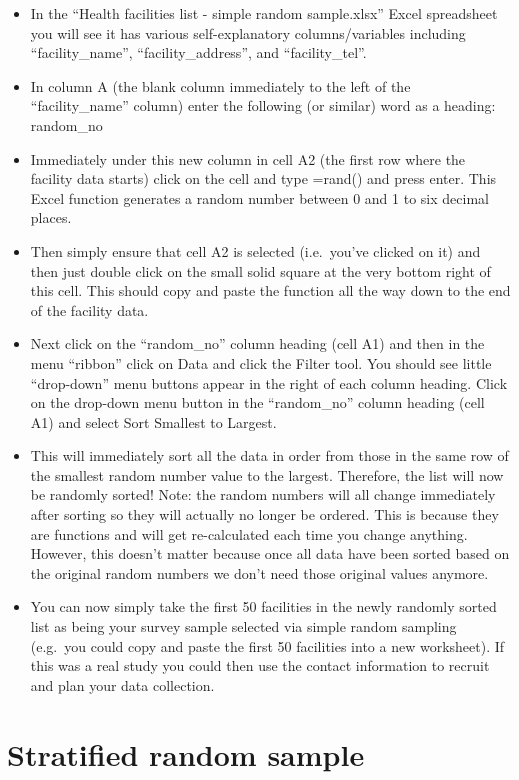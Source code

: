 \documentclass[
]{book}
\begin{document}
\begin{itemize}
\item
  In the ``Health facilities list - simple random sample.xlsx'' Excel spreadsheet you will see it has various self-explanatory columns/variables including ``facility\_name'', ``facility\_address'', and ``facility\_tel''.
\item
  In column A (the blank column immediately to the left of the ``facility\_name'' column) enter the following (or similar) word as a heading: random\_no
\item
  Immediately under this new column in cell A2 (the first row where the facility data starts) click on the cell and type =rand() and press enter. This Excel function generates a random number between 0 and 1 to six decimal places.
\item
  Then simply ensure that cell A2 is selected (i.e.~you've clicked on it) and then just double click on the small solid square at the very bottom right of this cell. This should copy and paste the function all the way down to the end of the facility data.
\item
  Next click on the ``random\_no'' column heading (cell A1) and then in the menu ``ribbon'' click on Data and click the Filter tool. You should see little ``drop-down'' menu buttons appear in the right of each column heading. Click on the drop-down menu button in the ``random\_no'' column heading (cell A1) and select Sort Smallest to Largest.
\item
  This will immediately sort all the data in order from those in the same row of the smallest random number value to the largest. Therefore, the list will now be randomly sorted! Note: the random numbers will all change immediately after sorting so they will actually no longer be ordered. This is because they are functions and will get re-calculated each time you change anything. However, this doesn't matter because once all data have been sorted based on the original random numbers we don't need those original values anymore.
\item
  You can now simply take the first 50 facilities in the newly randomly sorted list as being your survey sample selected via simple random sampling (e.g.~you could copy and paste the first 50 facilities into a new worksheet). If this was a real study you could then use the contact information to recruit and plan your data collection.
\end{itemize}

\hypertarget{stratified-random-sample}{%
\section{Stratified random sample}\label{stratified-random-sample}}
\end{document}
